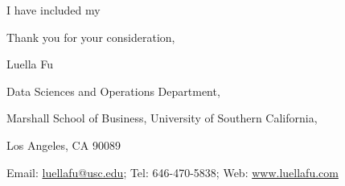 \documentclass[a4paper]{article}
\begin{document}
	\medskip
	
	I have included my %
	
	\bigskip
	
	\noindent Thank you for your consideration, 
	
	\noindent Luella Fu
	
	\medskip
	
	{\footnotesize
	\noindent Data Sciences and Operations Department, 
	
	\noindent Marshall School of Business, University of Southern California,
	
	\noindent Los Angeles, CA 90089
	
	\noindent Email: \url{luellafu@usc.edu}; Tel: 646-470-5838; Web: \url{www.luellafu.com}
	}
	
\end{document}
